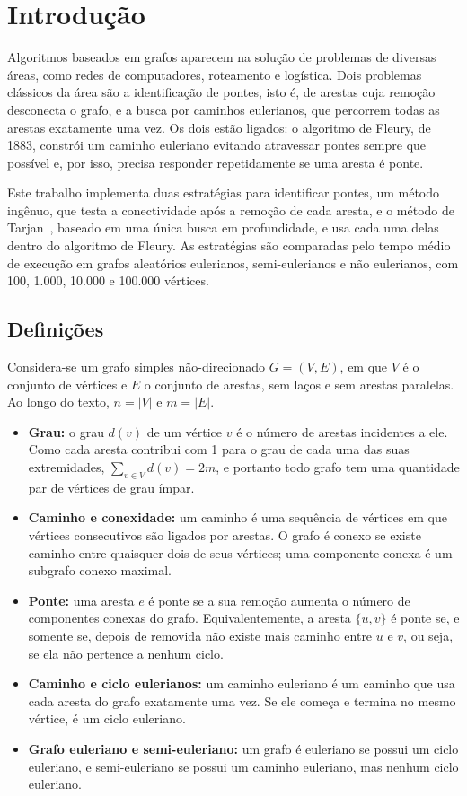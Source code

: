 \section{Introdução}

Algoritmos baseados em grafos aparecem na solução de problemas de diversas áreas, como redes de computadores, roteamento e logística. Dois problemas clássicos da área são a identificação de pontes, isto é, de arestas cuja remoção desconecta o grafo, e a busca por caminhos eulerianos, que percorrem todas as arestas exatamente uma vez. Os dois estão ligados: o algoritmo de Fleury, de 1883, constrói um caminho euleriano evitando atravessar pontes sempre que possível e, por isso, precisa responder repetidamente se uma aresta é ponte.

Este trabalho implementa duas estratégias para identificar pontes, um método ingênuo, que testa a conectividade após a remoção de cada aresta, e o método de Tarjan~\cite{tarjan1974}, baseado em uma única busca em profundidade, e usa cada uma delas dentro do algoritmo de Fleury. As estratégias são comparadas pelo tempo médio de execução em grafos aleatórios eulerianos, semi-eulerianos e não eulerianos, com 100, 1.000, 10.000 e 100.000 vértices.

\subsection{Definições}

Considera-se um grafo simples não-direcionado $G = (V, E)$, em que $V$ é o conjunto de vértices e $E$ o conjunto de arestas, sem laços e sem arestas paralelas. Ao longo do texto, $n = |V|$ e $m = |E|$.

\begin{itemize}
  \item \textbf{Grau:} o grau $d(v)$ de um vértice $v$ é o número de arestas incidentes a ele. Como cada aresta contribui com 1 para o grau de cada uma das suas extremidades, $\sum_{v \in V} d(v) = 2m$, e portanto todo grafo tem uma quantidade par de vértices de grau ímpar.
  \item \textbf{Caminho e conexidade:} um caminho é uma sequência de vértices em que vértices consecutivos são ligados por arestas. O grafo é conexo se existe caminho entre quaisquer dois de seus vértices; uma componente conexa é um subgrafo conexo maximal.
  \item \textbf{Ponte:} uma aresta $e$ é ponte se a sua remoção aumenta o número de componentes conexas do grafo. Equivalentemente, a aresta $\{u, v\}$ é ponte se, e somente se, depois de removida não existe mais caminho entre $u$ e $v$, ou seja, se ela não pertence a nenhum ciclo.
  \item \textbf{Caminho e ciclo eulerianos:} um caminho euleriano é um caminho que usa cada aresta do grafo exatamente uma vez. Se ele começa e termina no mesmo vértice, é um ciclo euleriano.
  \item \textbf{Grafo euleriano e semi-euleriano:} um grafo é euleriano se possui um ciclo euleriano, e semi-euleriano se possui um caminho euleriano, mas nenhum ciclo euleriano.
\end{itemize}


